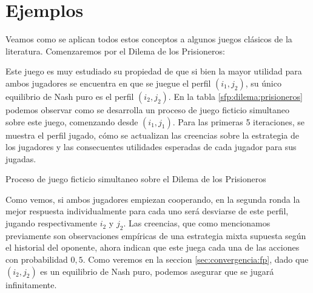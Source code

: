 




\section{Ejemplos}

Veamos como se aplican todos estos conceptos a algunos juegos clásicos de la literatura. Comenzaremos por el Dilema de los Prisioneros:





Este juego es muy estudiado su propiedad de que si bien la mayor utilidad para ambos jugadores se encuentra en que se juegue el perfil $(i_1, j_2)$, su único equilibrio de Nash puro es el perfil $(i_2, j_2)$. En la tabla \ref{sfp:dilema:prisioneros} podemos observar como se desarrolla un proceso de juego ficticio simultaneo sobre este juego, comenzando desde $(i_1, j_1)$. Para las primeras 5 iteraciones, se muestra el perfil jugado, cómo se actualizan las creencias sobre la estrategia de los jugadores y las consecuentes utilidades esperadas de cada jugador para sus jugadas.

\begin{table} %
    \centering
    
    \caption{Proceso de juego ficticio simultaneo sobre el Dilema de los Prisioneros}
    \label{sfp:dilema:prisioneros}
\end{table}

Como vemos, si ambos jugadores empiezan cooperando, en la segunda ronda la mejor respuesta individualmente para cada uno será desviarse de este perfil, jugando respectivamente $i_2$ y $j_2$. Las creencias, que como mencionamos previamente son observaciones empíricas de una estrategia mixta supuesta según el historial del oponente, ahora indican que este juega cada una de las acciones con probabilidad $0,5$. Como veremos en la seccion \ref{sec:convergencia:fp}, dado que $(i_2, j_2)$ es un equilibrio de Nash puro, podemos asegurar que se jugará infinitamente.

